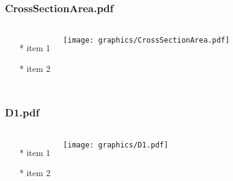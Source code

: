 \begin{frame} \frametitle{CrossSectionArea.pdf}
    \begin{columns}[c]
        \begin{itemize}
            \item[*] item 1
            \item[*] item 2
        \end{itemize}
        \begin{minipage}{\linewidth}
            \begin{center}
            \texttt{[image: graphics/CrossSectionArea.pdf]}
            \label{gfx:CrossSectionArea.pdf}
            \end{center}
        \end{minipage}
    \end{columns}
\end{frame}
\begin{frame} \frametitle{D1.pdf}
    \begin{columns}[c]
        \begin{itemize}
            \item[*] item 1
            \item[*] item 2
        \end{itemize}
        \begin{minipage}{\linewidth}
            \begin{center}
            \texttt{[image: graphics/D1.pdf]}
            \label{gfx:D1.pdf}
            \end{center}
        \end{minipage}
    \end{columns}
\end{frame}
